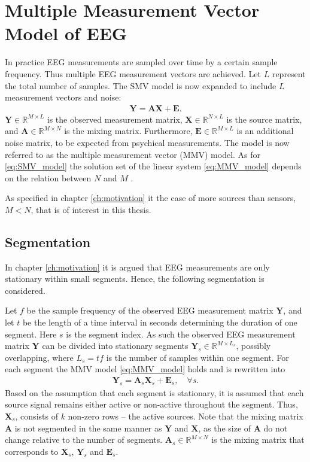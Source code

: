 \section{Multiple Measurement Vector Model of EEG}\label{sec:MMV}
In practice EEG measurements are sampled over time by a certain sample frequency. 
Thus multiple EEG measurement vectors are achieved.
Let $L$ represent the total number of samples. 
The SMV model is now expanded to include $L$ measurement vectors and noise:
\begin{align}\label{eq:MMV_model}
\mathbf{Y} = \mathbf{AX}+\textbf{E}.
\end{align}
$\mathbf{Y} \in \mathbb{R}^{M \times L}$ is the observed measurement matrix, $\mathbf{X} \in \mathbb{R}^{N \times L}$ is the source matrix, and $\mathbf{A} \in \mathbb{R}^{M \times N}$ is the mixing matrix. 
Furthermore, $\mathbf{E} \in \mathbb{R}^{M \times L}$ is an additional noise matrix, to be expected from psychical measurements.  
The model is now referred to as the multiple measurement vector (MMV) model.
As for \eqref{eq:SMV_model} the solution set of the linear system \eqref{eq:MMV_model} depends on the relation between $N$ and $M$ \cite[p. 42]{CS}. 

As specified in chapter \ref{ch:motivation} it the case of more sources than sensors, $M<N$, that is of interest in this thesis.  

\subsection{Segmentation}\label{seg_segmentation}
In chapter \ref{ch:motivation} it is argued that EEG measurements are only stationary within small segments. 
Hence, the following segmentation is considered.

Let $f$ be the sample frequency of the observed EEG measurement matrix $\mathbf{Y}$, and let $t$ be the length of a time interval in seconds determining the duration of one segment. 
Here $s$ is the segment index. 
As such the observed EEG measurement matrix $\mathbf{Y}$ can be divided into stationary segments $\mathbf{Y}_s \in \mathbb{R}^{M \times L_{s}}$, possibly overlapping, where $L_s = t f$ is the number of samples within one segment. 
For each segment the MMV model \eqref{eq:MMV_model} holds and is rewritten into
\begin{align}\label{eq:MMV_seg}
\mathbf{Y}_s = \textbf{A}_s\mathbf{X}_s + \textbf{E}_s, \quad \forall s.
\end{align}
Based on the assumption that each segment is stationary, it is assumed that each source signal remains either active or non-active throughout the segment.
Thus, $\mathbf{X}_s$, consists of $k$ non-zero rows -- the active sources.
Note that the mixing matrix $\textbf{A}$ is not segmented in the same manner as $\textbf{Y}$ and $\textbf{X}$, as the size of $\textbf{A}$ do not change relative to the number of segments. $\textbf{A}_s\in \mathbb{R}^{M\times N}$ is the mixing matrix that corresponds to $\textbf{X}_s$, $\textbf{Y}_s$ and $\textbf{E}_s$.

